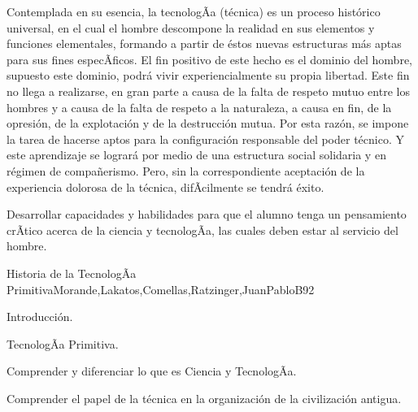 \begin{syllabus}


\begin{justification}

Contemplada en su esencia, la tecnologÃ­a (técnica) es un proceso histórico universal, en el cual el hombre descompone la realidad en sus elementos y funciones elementales, formando a partir de éstos nuevas estructuras más aptas para sus fines especÃ­ficos.
El fin positivo de este hecho es el dominio del hombre,  supuesto este dominio, podrá vivir experiencialmente su propia libertad. Este fin no llega a realizarse, en gran parte a causa de la falta de respeto mutuo entre los hombres y a causa de la falta de respeto a la naturaleza, a causa en fin, de la opresión, de la explotación y de la destrucción mutua.
Por esta razón, se impone la tarea de hacerse aptos para la configuración responsable del poder técnico. Y este aprendizaje se logrará por medio de una estructura social solidaria y en régimen de compañerismo. Pero, sin la correspondiente aceptación de la experiencia dolorosa de la técnica, difÃ­cilmente se tendrá éxito.
\end{justification}

\begin{goals}
\item Desarrollar capacidades y habilidades para que el alumno tenga un pensamiento crÃ­tico acerca de  la ciencia y tecnologÃ­a, las cuales deben estar al servicio del hombre.
\end{goals}

\begin{outcomes}
\end{outcomes}

\begin{unit}{Historia de la TecnologÃ­a Primitiva}{Morande,Lakatos,Comellas,Ratzinger,JuanPabloB}{9}{2}
\begin{topics}
      \item Introducción.
      \item TecnologÃ­a Primitiva.
\end{topics}

\begin{unitgoals}
	\item Comprender y diferenciar lo que es Ciencia y TecnologÃ­a. 
 	\item Comprender el papel de la técnica en la organización de la civilización antigua.
\end{unitgoals}
\end{unit}


\end{syllabus}
